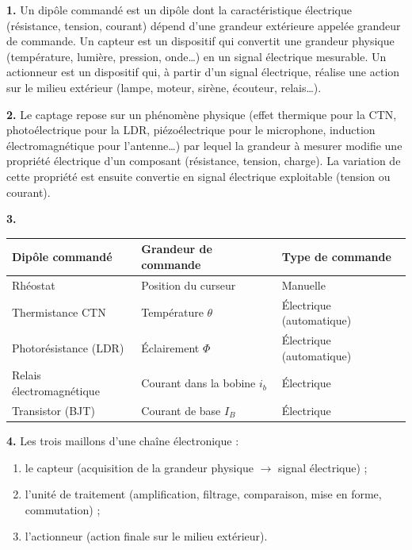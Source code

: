 \documentclass[11pt]{article}
\newcommand{\cle}[1]{{\popxbold\color{popdark}#1}}
\begin{document}
\begin{corrige}
\textbf{1.} Un \cle{dipôle commandé} est un dipôle dont la caractéristique électrique (résistance, tension, courant) dépend d'une grandeur extérieure appelée \cle{grandeur de commande}. Un \cle{capteur} est un dispositif qui convertit une grandeur physique (température, lumière, pression, onde\ldots) en un signal électrique mesurable. Un \cle{actionneur} est un dispositif qui, à partir d'un signal électrique, réalise une action sur le milieu extérieur (lampe, moteur, sirène, écouteur, relais\ldots).

\textbf{2.} Le captage repose sur un phénomène physique (effet thermique pour la CTN, photoélectrique pour la LDR, piézoélectrique pour le microphone, induction électromagnétique pour l'antenne\ldots) par lequel la grandeur à mesurer modifie une propriété électrique d'un composant (résistance, tension, charge). La variation de cette propriété est ensuite convertie en signal électrique exploitable (tension ou courant).

\textbf{3.} 
\begin{center}
\begin{tabularx}{\linewidth}{|l|X|X|}\hline
\rowcolor{popblueL} \textbf{Dipôle commandé} & \textbf{Grandeur de commande} & \textbf{Type de commande} \\ \hline
Rhéostat & Position du curseur & Manuelle \\ \hline
Thermistance CTN & Température $\theta$ & Électrique (automatique) \\ \hline
Photorésistance (LDR) & Éclairement $\Phi$ & Électrique (automatique) \\ \hline
Relais électromagnétique & Courant dans la bobine $i_b$ & Électrique \\ \hline
Transistor (BJT) & Courant de base $I_B$ & Électrique \\ \hline
\end{tabularx}
\end{center}

\textbf{4.} Les trois maillons d'une \cle{chaîne électronique} : 
\begin{enumerate}
\item le \cle{capteur} (acquisition de la grandeur physique $\rightarrow$ signal électrique) ;
\item l'\cle{unité de traitement} (amplification, filtrage, comparaison, mise en forme, commutation) ;
\item l'\cle{actionneur} (action finale sur le milieu extérieur).
\end{enumerate}
\end{corrige}
\end{document}
